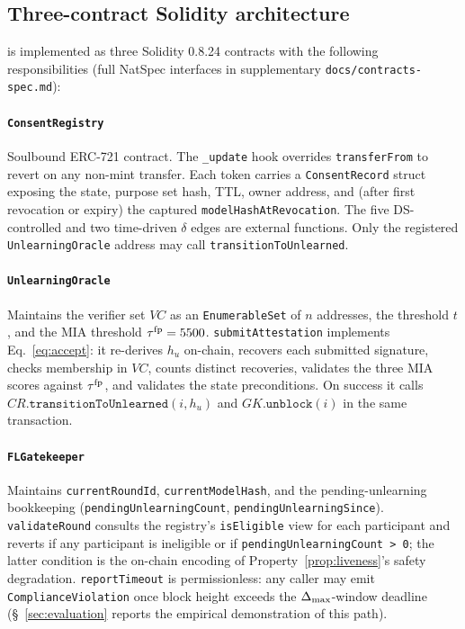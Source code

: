 \subsection{Three-contract Solidity architecture}
\label{sec:framework-contracts}

\sysname is implemented as three Solidity 0.8.24 contracts with the
following responsibilities (full NatSpec interfaces in supplementary
\texttt{docs/contracts-spec.md}):

\paragraph{\texttt{ConsentRegistry}} Soulbound ERC-721 contract. The \texttt{\_update} hook overrides
\texttt{transferFrom} to revert on any non-mint transfer. Each token
carries a \texttt{ConsentRecord} struct exposing the \clsm state,
purpose set hash, TTL, owner address, and (after first revocation
or expiry) the captured \texttt{modelHashAtRevocation}. The five
DS-controlled and two time-driven $\delta$ edges are external
functions. Only the registered \texttt{UnlearningOracle} address may
call \texttt{transitionToUnlearned}.

\paragraph{\texttt{UnlearningOracle}} Maintains the verifier set
$\mathit{VC}$ as an \texttt{EnumerableSet} of $n$ addresses, the
threshold $t$, and the MIA threshold $\tau^{\mathrm{fp}} = 5500$.
\texttt{submitAttestation} implements Eq.~\ref{eq:accept}: it
re-derives $h_u$ on-chain, recovers each submitted signature, checks
membership in $\mathit{VC}$, counts distinct recoveries, validates the
three MIA scores against $\tau^{\mathrm{fp}}$, and validates the
state preconditions. On success it calls
$\mathit{CR}.\mathtt{transitionToUnlearned}(i, h_u)$ and
$\mathit{GK}.\mathtt{unblock}(i)$ in the same transaction.

\paragraph{\texttt{FLGatekeeper}} Maintains \texttt{currentRoundId},
\texttt{currentModelHash}, and the pending-unlearning bookkeeping
(\texttt{pendingUnlearningCount}, \texttt{pendingUnlearningSince}).
\texttt{validateRound} consults the registry's \texttt{isEligible}
view for each participant and reverts if any participant is
ineligible or if \texttt{pendingUnlearningCount > 0}; the latter
condition is the on-chain encoding of
Property~\ref{prop:liveness}'s safety degradation.
\texttt{reportTimeout} is permissionless: any caller may emit
\texttt{ComplianceViolation} once block height exceeds the
$\Delta_{\max}$-window deadline (\S~\ref{sec:evaluation} reports the empirical
demonstration of this path).

